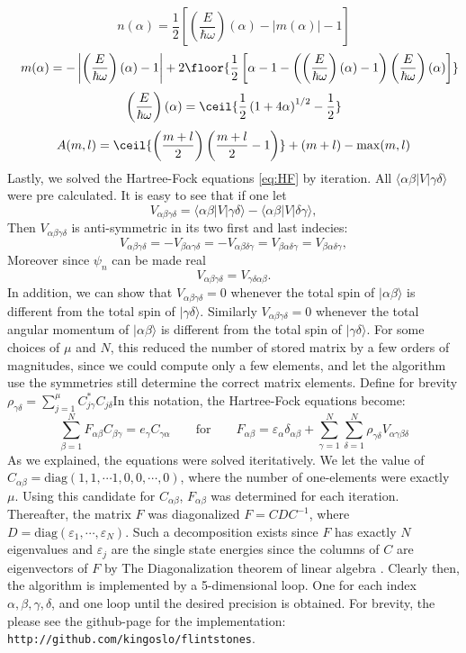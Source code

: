 \documentclass[11pt,english,a4paper]{article}
\begin{document}
\[
n(\alpha) = \frac{1}{2} \left[ \left(\frac{E}{\hbar \omega} \right)(\alpha) - |m(\alpha)| - 1 \right]\]
\[ \quad m(\alpha) = - \left| \left(\frac{E}{\hbar \omega} \right)(\alpha) - 1 \right| + 2 \floor{ \frac{1}{2}\left[\alpha - 1 - \left( \left(\frac{E}{\hbar \omega} \right)(\alpha) - 1 \right)\left(\frac{E}{\hbar \omega} \right)(\alpha) \right] }
\]
\[
\left(\frac{E}{\hbar \omega} \right)(\alpha) = \ceil{\frac{1}{2}\left( 1 + 4\alpha \right)^{1/2} - \frac{1}{2} }
\]
\[
A(m,l) = \ceil{ \left( \frac{m+l}{2} \right)\left( \frac{m+l}{2} -1 \right) } + (m+l) - \max(m,l)
\]
Lastly, we solved the Hartree-Fock equations \ref{eq:HF} by iteration. All $\langle \alpha \beta | V  |  \gamma \delta \rangle$ were pre calculated. It is easy to see that if one let 
\[
V_{  \alpha \beta \gamma \delta} = \langle \alpha \beta | V  |  \gamma \delta \rangle - \langle \alpha \beta | V  |  \delta \gamma \rangle,
\]
Then $V_{  \alpha \beta \gamma \delta}$ is anti-symmetric in its two first and last indecies:
\[
V_{  \alpha \beta \gamma \delta} = -V_{  \beta\alpha  \gamma \delta} = -V_{  \alpha \beta \delta \gamma } = V_{  \beta \alpha \delta\gamma } = V_{  \beta \alpha \delta\gamma },
\]
Moreover since $\psi_n$ can be made real
\[
V_{  \alpha \beta \gamma \delta} = V_{  \gamma \delta\alpha \beta}.
\]
In addition, we can show that $V_{  \alpha \beta \gamma \delta} = 0$ whenever the total spin of $ |  \alpha \beta \rangle $ is different from the total spin of $ |  \gamma  \delta \rangle $. Similarly $V_{  \alpha \beta \gamma \delta} = 0$ whenever the total angular momentum of $ |  \alpha \beta \rangle $ is different from the total spin of $ |  \gamma  \delta \rangle$. For some choices of $\mu$ and $N$, this reduced the number of stored matrix by a few orders of magnitudes, since we could compute only a few elements, and let the algorithm use the symmetries still determine the correct matrix elements. Define for brevity $\rho_{ \gamma \delta} = \sum_{j=1}^\mu C_{  j \gamma}^* C_{  j \delta}$In this notation, the Hartree-Fock equations become:
\[
\sum_{  \beta = 1}^N F_{  \alpha \beta} C_{  \beta \gamma} = e_\gamma C_{  \gamma \alpha} \qquad \text{for} \qquad F_{  \alpha \beta} = \varepsilon_{  \alpha} \delta_{  \alpha \beta} + \sum_{  \gamma = 1}^N \sum_{  \delta = 1}^N  \rho_{ \gamma \delta}V_{  \alpha \gamma \beta \delta}
\]
As we explained, the equations were solved iteritatively. We let the value of $C_{  \alpha \beta} = \text{diag}(1,1,\cdots 1,0,0,\cdots,0)$, where the number of one-elements were exactly $\mu$. Using this candidate for $C_{  \alpha \beta}$, $F_{  \alpha \beta}$ was determined for each iteration. Thereafter, the matrix $F$ was diagonalized $F = CDC^{  -1}$, where $D = \text{diag} ( \varepsilon_1, \cdots, \varepsilon_N)$. Such a decomposition exists since $F$ has exactly $N$ eigenvalues and $\varepsilon_j$ are the single state energies since the columns of $C$ are eigenvectors of $F$ by The Diagonalization theorem of linear algebra \parencite[282]{lay_linear_2012}. Clearly then, the algorithm is implemented by a 5-dimensional loop. One for each index $\alpha, \beta, \gamma, \delta$, and one loop until the desired precision is obtained. For brevity, the please see the github-page for the implementation: \texttt{http://github.com/kingoslo/flintstones}.\\
\end{document}
